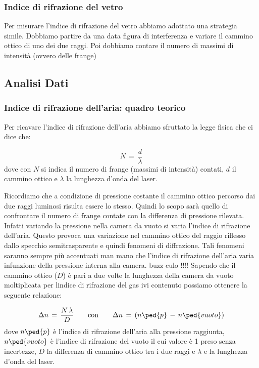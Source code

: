 \subsubsection{Indice di rifrazione del vetro}

Per misurare l'indice di rifrazione del vetro abbiamo adottato una strategia simile. Dobbiamo partire da una data figura di interferenza e variare il cammino ottico di uno dei due raggi. Poi dobbiamo contare il numero di massimi di intensità (ovvero delle frange)

\subsection{Analisi Dati}

\subsubsection{Indice di rifrazione dell'aria: quadro teorico}

Per ricavare l'indice di rifrazione dell'aria abbiamo sfruttato la legge fisica che ci dice che:


\begin{equation}
	N \,=\, \frac{d}{\lambda}
\end{equation}
%
dove con $N$  si indica il numero di frange (massimi di intensità) contati, $d$ il cammino ottico e $\lambda$ la lunghezza d'onda del laser.

Ricordiamo che a condizione di pressione costante il cammino ottico percorso dai due raggi luminosi risulta essere lo stesso.
Quindi lo scopo sarà quello di confrontare il numero di frange contate con la differenza di pressione rilevata. Infatti variando la pressione nella camera da vuoto si varia l'indice di rifrazione dell'aria. Questo provoca una variazione nel cammino ottico del raggio riflesso dallo specchio semitrasparente e quindi fenomeni di diffrazione. Tali fenomeni saranno sempre più accentuati man mano che l'indice di rifrazione dell'aria varia infunzione della pressione interna alla camera. buzz culo !!!!
Sapendo che il cammino ottico ($D$) è pari a due volte la lunghezza della camera da vuoto moltiplicata per lindice di rifrazione del gas ivi contenuto possiamo ottenere la seguente relazione:

\begin{equation}
	\Delta{n} \,=\, \frac{N \, \lambda}{D} \qquad \text{con} \qquad \Delta{n} \,=\, (n\ped{p} \,-\, n\ped{vuoto})
	\label{eq:delta_n}
\end{equation}
%
dove $n\ped{p}$ è l'indice di rifrazione dell'aria alla pressione raggiunta, $n\ped{vuoto}$ è l'indice di rifrazione del vuoto il cui valore è 1 preso senza incertezze, $D$ la differenza di cammino ottico tra i due raggi e $\lambda$ e la lunghezza d'onda del laser.

